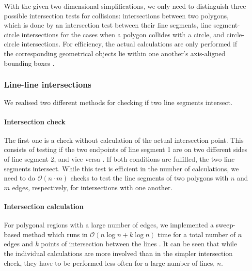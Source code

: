 With the given two-dimensional simplifications, we only need to distinguish three possible 
intersection tests for collisions: intersections between two polygons, which is done by an intersection
test between their line segments, line segment-circle intersections for the cases when a polygon 
collides with a circle, and circle-circle intersections. 
For efficiency, the actual calculations are only performed if the corresponding geometrical objects lie within 
one another's axis-aligned bounding boxes \cite{web_aabb}.

\subsubsection*{Line-line intersections}
We realised two different methods for checking if two line segments intersect.

\paragraph{Intersection check}
The first one is a check without calculation of the actual intersection point. 
This consists of testing if the two endpoints of line segment 1 are on two different sides of line
segment 2, and vice versa \cite{IntersectionCheck2021}. If both conditions are fulfilled, the two line segments intersect.
While this test is efficient in the number of calculations, we need to do $\mathcal{O}\left(n \cdot m\right)$ checks
to test the line segments of two polygons with $n$ and $m$ edges, respectively, for intersections with one another.

\paragraph{Intersection calculation}
For polygonal regions with a large number of edges, we implemented a sweep-based method which runs
in $\mathcal{O}\left(n \log n + k \log n\right)$ time for a total number of $n$ edges and $k$ points
of intersection between the lines \cite[p. 29]{Berg2008}.
It can be seen that while the individual calculations are more involved than in the simpler intersection check, 
they have to be performed less often for a large number of lines, $n$.

